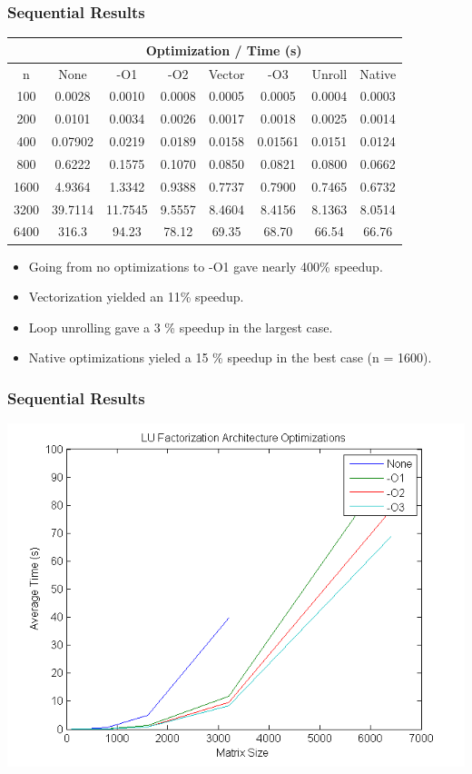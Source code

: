 \documentclass{beamer}
\begin{document}
\begin{frame}[fragile]
\frametitle{Sequential Results}

\begin{tabular}{|c|c|c|c|c|c|c|c|}
\hline
& \multicolumn{7}{|c|}{Optimization / Time (s)} \\
\hline
n & None & -O1 & -O2 & Vector & -O3 & Unroll & Native\\
\hline
100	& 0.0028 & 0.0010 & 0.0008 & 0.0005 & 0.0005 & 0.0004 & 0.0003 \\
200	& 0.0101 & 0.0034 &	0.0026 & 0.0017 & 0.0018 & 0.0025 & 0.0014 \\
400	& 0.07902 & 0.0219 & 0.0189 & 0.0158 & 0.01561 & 0.0151 & 0.0124 \\
800	& 0.6222 & 0.1575 & 0.1070 & 0.0850 & 0.0821 & 0.0800 & 0.0662 \\
1600 & 4.9364 & 1.3342 & 0.9388 & 0.7737 & 0.7900 & 0.7465 & 0.6732 \\
3200&39.7114 & 11.7545 & 9.5557 & 8.4604 &	8.4156 & 8.1363 & 8.0514 \\
6400 & 316.3 & 94.23 & 78.12 &	69.35 & 68.70 & 66.54 & 66.76\\
\hline
\end{tabular}

\begin{itemize}
\setlength\itemsep{0.25em}
\item Going from no optimizations to -O1 gave nearly 400\% speedup.  
\item Vectorization yielded an 11\% speedup.
\item Loop unrolling gave a 3 \% speedup in the largest case.
\item Native optimizations yieled a 15 \% speedup in the best case (n = 1600).  
\end{itemize}

\end{frame}

\begin{frame}
\frametitle{Sequential Results}

\begin{center}
\includegraphics[scale=0.5]{figures/fig2}
\end{center}

\end{frame}
\end{document}
